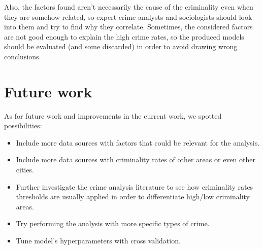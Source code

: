 \documentclass[12pt, openany]{report}
\begin{document}
Also, the factors found aren’t necessarily the cause of the criminality even when they are somehow related, so expert crime analysts and sociologists should look into them and try to find why they correlate. Sometimes, the considered factors are not good enough to explain the high crime rates, so the produced models should be evaluated (and some discarded) in order to avoid drawing wrong conclusions.

\section{Future work}

As for future work and improvements in the current work, we spotted possibilities:

\begin{itemize}

\item Include more data sources with factors that could be relevant for the analysis.
\item Include more data sources with criminality rates of other areas or even other cities.
\item Further investigate the crime analysis literature to see how criminality rates thresholds are usually applied in order to differentiate high/low criminality areas.
\item Try performing the analysis with more specific types of crime.
\item Tune model's hyperparameters with cross validation.

\end{itemize}
\end{document}
